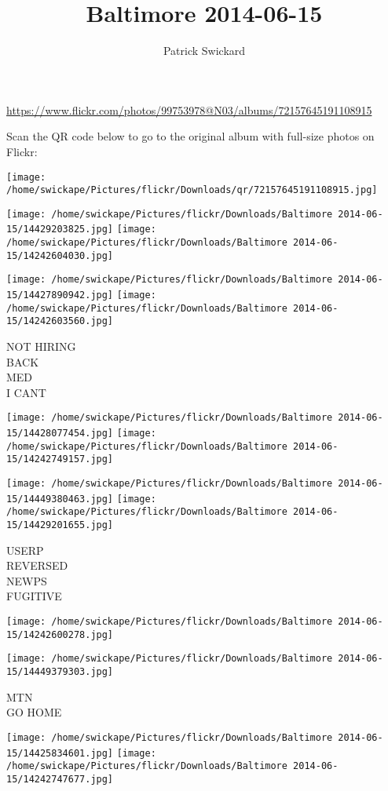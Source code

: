 \documentclass[10pt,letterpaper]{article}
\title{Baltimore 2014-06-15}
\author{Patrick Swickard}
\date{}
\begin{document}
\maketitle

\url{https://www.flickr.com/photos/99753978@N03/albums/72157645191108915}

Scan the QR code below to go to the original album with full-size photos on Flickr:

\texttt{[image: /home/swickape/Pictures/flickr/Downloads/qr/72157645191108915.jpg]}
\pagebreak

\texttt{[image: /home/swickape/Pictures/flickr/Downloads/Baltimore 2014-06-15/14429203825.jpg]}
\texttt{[image: /home/swickape/Pictures/flickr/Downloads/Baltimore 2014-06-15/14242604030.jpg]}

\texttt{[image: /home/swickape/Pictures/flickr/Downloads/Baltimore 2014-06-15/14427890942.jpg]}
\texttt{[image: /home/swickape/Pictures/flickr/Downloads/Baltimore 2014-06-15/14242603560.jpg]}

NOT HIRING\\
BACK\\
MED\\
I CANT
\pagebreak

\texttt{[image: /home/swickape/Pictures/flickr/Downloads/Baltimore 2014-06-15/14428077454.jpg]}
\texttt{[image: /home/swickape/Pictures/flickr/Downloads/Baltimore 2014-06-15/14242749157.jpg]}

\texttt{[image: /home/swickape/Pictures/flickr/Downloads/Baltimore 2014-06-15/14449380463.jpg]}
\texttt{[image: /home/swickape/Pictures/flickr/Downloads/Baltimore 2014-06-15/14429201655.jpg]}

USERP\\
REVERSED\\
NEWPS\\
FUGITIVE
\pagebreak

\texttt{[image: /home/swickape/Pictures/flickr/Downloads/Baltimore 2014-06-15/14242600278.jpg]}

\vspace{0.25in}
\texttt{[image: /home/swickape/Pictures/flickr/Downloads/Baltimore 2014-06-15/14449379303.jpg]}

MTN\\
GO HOME
\pagebreak

\texttt{[image: /home/swickape/Pictures/flickr/Downloads/Baltimore 2014-06-15/14425834601.jpg]}
\texttt{[image: /home/swickape/Pictures/flickr/Downloads/Baltimore 2014-06-15/14242747677.jpg]}
\end{document}
